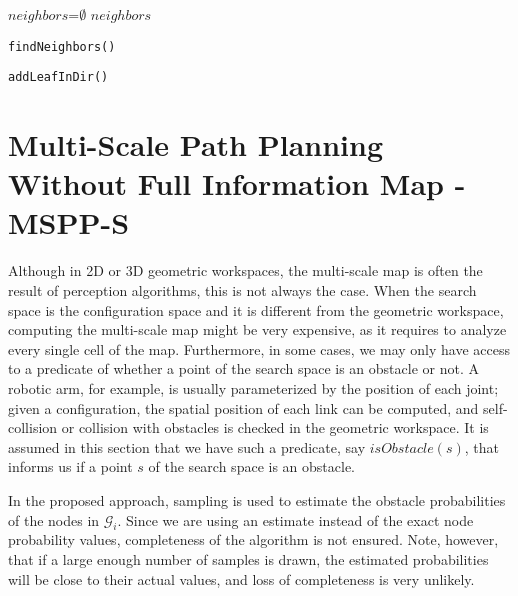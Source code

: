 \documentclass[letterpaper, 10 pt, conference]{ieeeconf}
\makeatletter
\theoremstyle{definition}
\newcounter{megaalgorithm}
\newenvironment{megaalgorithm}[1][htb]
  {\renewcommand{\algorithmcfname}{Function}\let\c@algocf\c@megaalgorithm \begin{algorithm}[#1]}{\end{algorithm}}
\makeatother
\begin{document}
\begin{megaalgorithm}[ht]
 $neighbors$=$\emptyset$\;
 	\Return $neighbors$\;

 \caption{\tt findNeighbors()}
\label{algo:findNeighbor}
\end{megaalgorithm}

\begin{megaalgorithm}[ht]

 \caption{\tt addLeafInDir()}
\label{algo:addLeafInDir}
\end{megaalgorithm}

\section{Multi-Scale Path Planning Without Full Information Map - MSPP-S}

Although in 2D or 3D geometric workspaces, the multi-scale map is often the result of perception algorithms, this is not always the case.
When the search space is the configuration space and it is different from the geometric workspace, computing the multi-scale map might be very expensive, as it requires to analyze every single cell of the map.
Furthermore, in some cases, we may only have access to a predicate of whether a point of the search space is an obstacle or not.
A robotic arm, for example, is usually parameterized by the position of each joint; given a configuration, the spatial position of each link can be computed, and self-collision or collision with obstacles is checked in the geometric workspace.
It is assumed in this section that we have such a predicate, say $isObstacle(s)$, that informs us if a point $s$ of the search space is an obstacle.

In the proposed approach, sampling is used to estimate the obstacle probabilities of the nodes in $\mathcal{G}_i$.
Since we are using an estimate instead of the exact node probability values, completeness of the algorithm is not ensured.
Note, however, that if a large enough number of samples is drawn, the estimated probabilities will be close to their actual values,
and loss of completeness is very unlikely.
\end{document}
